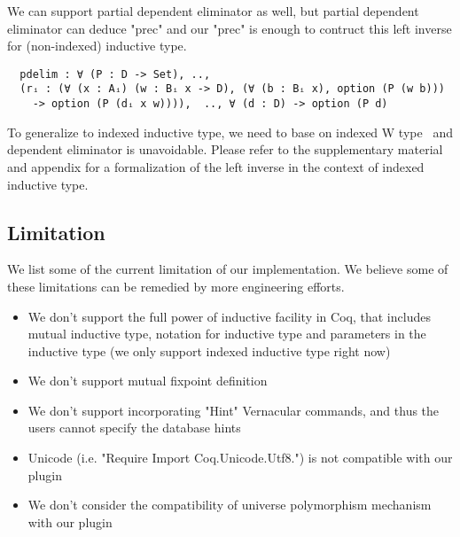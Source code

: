 We can support partial dependent eliminator as well, but partial dependent eliminator can deduce "prec" and our "prec" is enough to contruct this left inverse for (non-indexed) inductive type. 
\begin{verbatim}
  pdelim : ∀ (P : D -> Set), .., 
  (rᵢ : (∀ (x : Aᵢ) (w : Bᵢ x -> D), (∀ (b : Bᵢ x), option (P (w b))) 
    -> option (P (dᵢ x w)))),  .., ∀ (d : D) -> option (P d)
\end{verbatim}
To generalize to indexed inductive type, we need to base on indexed W type~\cite{martin1982constructive, morris2009indexed,jashug2017} and dependent eliminator is unavoidable. Please refer to the supplementary material and appendix for a formalization of the left inverse in the context of indexed inductive type.   


\subsection{Limitation}
We list some of the current limitation of our implementation. We believe some of these limitations can be remedied by more engineering efforts.
\begin{itemize}
  \item We don't support the full power of inductive facility in Coq, that includes mutual inductive type, notation for inductive type and parameters in the inductive type (we only support indexed inductive type right now)
  \item We don't support mutual fixpoint definition
  \item We don't support incorporating "Hint" Vernacular commands, and thus the users cannot specify the database hints
  \item Unicode (i.e. "Require Import Coq.Unicode.Utf8.") is not compatible with our plugin 
  \item We don't consider the compatibility of universe polymorphism mechanism with our plugin
\end{itemize}